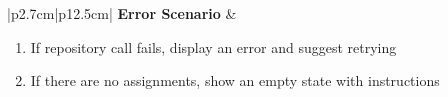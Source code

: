 \begin{table}[H]
\begin{tabular}{|p{2.7cm}|p{12.5cm}|}
        \hline
        \textbf{Error Scenario} & \begin{minipage}[t]{\linewidth}
                                      \begin{enumerate}[topsep=0pt,itemsep=1pt,parsep=0pt,partopsep=0pt]
                                          \item If repository call fails, display an error and suggest retrying
                                          \item If there are no assignments, show an empty state with instructions
                                      \end{enumerate}
                                  \end{minipage} \\
        \hline
    \end{tabular}
    \label{tab:teacher-view-my-vm-assignments}
\end{table}






